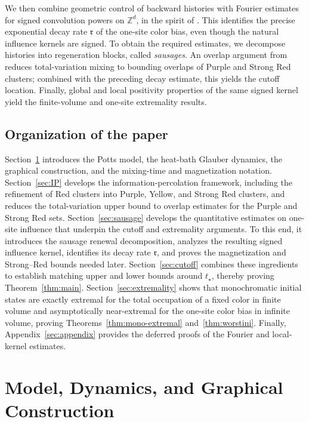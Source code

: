 \documentclass[letterpaper,11pt,reqno]{amsart}
\theoremstyle{definition}
\begin{document}
We then combine geometric control of backward histories with Fourier estimates for signed convolution powers on \(\mathbb Z^d\), in the spirit of \cite{ConvPower}. This identifies the precise exponential decay rate $\mathfrak{r}$ of the one-site color bias, even though the natural influence kernels are signed.
To obtain the required estimates, we decompose histories into regeneration blocks, called \emph{sausages}.
An overlap argument from \cite{MillerPeres} reduces total-variation mixing to bounding overlaps of Purple and Strong Red clusters; combined with the preceding decay estimate, this yields the cutoff location.
Finally, global and local positivity properties of the same signed kernel yield the finite-volume and one-site extremality results.




\subsection{Organization of the paper}

Section~\ref{sec:prelim} introduces the Potts model, the heat-bath Glauber dynamics, the graphical construction, and the mixing-time and magnetization notation.
Section~\ref{sec:IP} develops the information-percolation framework, including the refinement of Red clusters into Purple, Yellow, and Strong Red clusters, and reduces the total-variation upper bound to overlap estimates for the Purple and Strong Red sets.
Section~\ref{sec:sausage} develops the quantitative estimates on one-site influence that underpin the cutoff and extremality arguments. To this end, it introduces the sausage renewal decomposition, analyzes the resulting signed influence kernel, identifies its decay rate $\mathfrak{r}$, and proves the magnetization and Strong--Red bounds needed later.
Section~\ref{sec:cutoff} combines these ingredients to establish matching upper and lower bounds around \(t_\star\), thereby proving Theorem~\ref{thm:main}.
Section~\ref{sec:extremality} shows that monochromatic initial states are exactly extremal for the total occupation of a fixed color in finite volume and asymptotically near-extremal for the one-site color bias in infinite volume, proving Theorems~\ref{thm:mono-extremal} and~\ref{thm:worstini}.
Finally, Appendix~\ref{sec:appendix} provides the deferred proofs of the Fourier and local-kernel estimates.



\medskip

\section{Model, Dynamics, and Graphical Construction}\label{sec:prelim}
\end{document}
